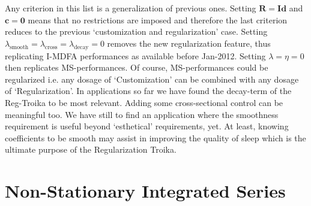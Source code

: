 \documentclass[11pt]{article}
\begin{document}
Any criterion in this list is a generalization of  previous ones. Setting $\mathbf{R=Id}$ and $\mathbf{c=0}$ means that no restrictions are imposed and therefore the last criterion reduces to the previous `customization and regularization' case. Setting $\lambda_{\textrm{smooth}}=\lambda_{\textrm{cross}}=\lambda_{\textrm{decay}}=0$ removes the new regularization feature, thus replicating I-MDFA performances as available before Jan-2012. Setting $\lambda=\eta=0$ then replicates MS-performances. Of course, MS-performances could be regularized i.e. any dosage of `Customization' can be combined with any dosage of `Regularization'. In applications so far we have found the decay-term of the Reg-Troika to be most relevant. Adding some cross-sectional control can be meaningful too. We have still to find an application where the smoothness requirement is useful beyond `esthetical' requirements, yet. At least, knowing coefficients to be smooth may assist in improving the quality of sleep which is the ultimate purpose of the Regularization Troika.


\section{Non-Stationary Integrated Series}\label{nsis}
\end{document}
